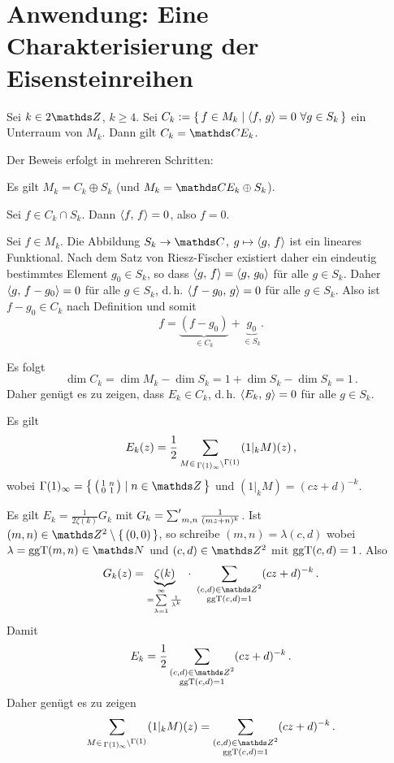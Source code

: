 \section{Anwendung: Eine Charakterisierung der Eisensteinreihen}

\begin{satz}\label{CharEk}
	Sei $k \in 2\ZZ$, $k \geq 4$. Sei $C_k := \Set{f \in M_k \mid \scalarprd{f}{g} = 0 \ \forall g \in S_k}$ ein Unterraum von $M_k$.
	Dann gilt $C_k = \CC E_k$.
\end{satz}


\begin{bewe}

	Der Beweis erfolgt in mehreren Schritten:
	\vspace{-2em}

\begin{lemm}
	Es gilt $M_k = C_k \oplus S_k$ (und $M_k = \CC E_k \oplus S_k$).
\end{lemm}

\begin{bewe}
	Sei $f \in C_k \cap S_k$. Dann $\scalarprd ff = 0$, also $f = 0$.
	
	Sei $f \in M_k$.
	Die Abbildung $S_k \ra \CC$, $g \mapsto \scalarprd gf$ ist ein lineares Funktional.
	Nach dem Satz von Riesz-Fischer existiert daher ein eindeutig bestimmtes Element $g_0 \in S_k$, so dass $\scalarprd gf = \scalarprd g{g_0}$ für alle $g \in S_k$.
	Daher $\scalarprd g{f-g_0} = 0$ für alle $g\in S_k$, d.\,h. $\scalarprd {f-g_0}g = 0$ für alle $g \in S_k$.
	Also ist $f-g_0 \in C_k$ nach Definition und somit
	\[
		f = \underbrace{(f-g_0)}_{\in C_k} + \underbrace{g_0}_{\in S_k} .
	\]
\end{bewe}

Es folgt
\[
	\dim C_k = \dim M_k - \dim S_k = 1 + \dim S_k - \dim S_k = 1\,.
\]
Daher genügt es zu zeigen, dass $E_k \in C_k$, d.\,h. $\scalarprd{E_k}g = 0$ für alle $g \in S_k$.

\begin{lemm}\label{Ek_per_Gamma(1)infty}
	Es gilt
	\[
		E_k(z) = \frac{1}{2} \sum_{M \in \linksmodulo{\Gamma(1)_\infty}{\Gamma(1)}} (1|_k M)(z)\,,
	\]
	wobei $\Gamma(1)_\infty = \Set{\mymat 1n01 \mid n \in \ZZ}$ und $(1|_k M) = (cz+d)^{-k}$.
\end{lemm}

\begin{bewe}
	Es gilt $E_k = \frac{1}{2\zeta(k)} G_k$ mit $G_k = \sumprime_{m,n} \frac{1}{(mz+n)^k}$.
	Ist $(m,n) \in \ZZ^2\setminus\Set{(0,0)}$, so schreibe $(m,n) = \lambda (c,d)$ wobei $\lambda = \ggt(m,n) \in \NN$ und $(c,d) \in \ZZ^2$ mit $\operatorname{ggT}(c,d) = 1$.
	Also
	\[
		G_k(z)
		= \underbrace{\zeta(k)}_{= \sum\limits_{\lambda=1}^\infty \frac{1}{\lambda^k}}\ \cdot\ \sum_{\substack{(c,d) \in \ZZ^2 \\ \ggt(c,d) = 1}} (cz+d)^{-k}
		\,.
	\]
	Damit
	\[
		E_k = \frac{1}{2} \sum_{\substack{(c,d) \in \ZZ^2 \\ \ggt(c,d) = 1}} (cz+d)^{-k}
		\,.
	\]
	Daher genügt es zu zeigen
	\[
		\sum_{M \in \linksmodulo{\Gamma(1)_\infty}{\Gamma(1)}} (1|_k M)(z)
		= \sum_{\substack{(c,d) \in \ZZ^2 \\ \ggt(c,d) = 1}} (cz+d)^{-k}
		\,.
	\]
	

\end{bewe}
\end{bewe}
